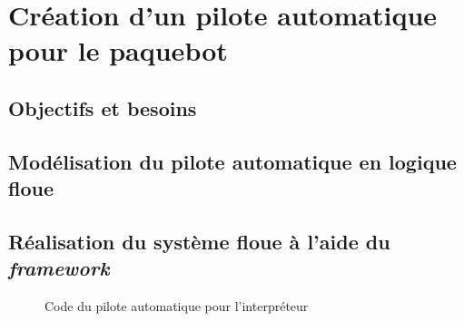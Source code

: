 \documentclass[a4paper,11pt]{article}
\begin{document}
    \section{Création d'un pilote automatique pour le paquebot}

    \subsection{Objectifs et besoins}

    \subsection{Modélisation du pilote automatique en logique floue}

    \subsection{Réalisation du système floue à l'aide du \textit{framework}}

    \begin{figure}
        \begin{center}
            \caption{Code du pilote automatique pour l’interpréteur}
            
            \label{fig:codeAutoPilot}
        \end{center}
    \end{figure}
\end{document}
